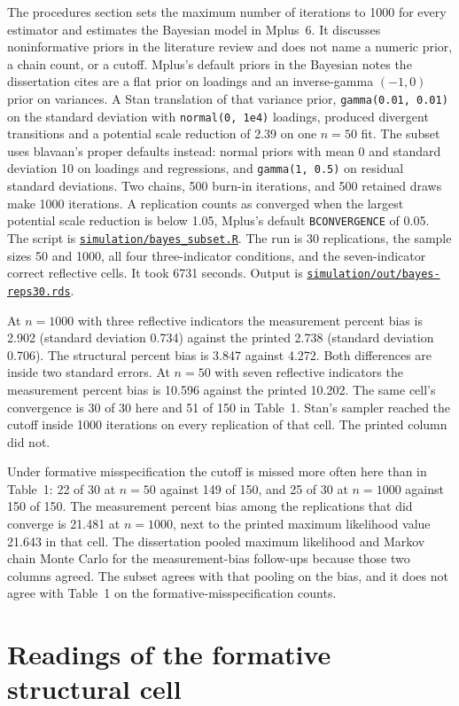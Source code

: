 \documentclass[11pt]{article}
\newcommand{\codebase}{https://github.com/alectionary/vibe-math/blob/master/formalization/chumney-sem-small-samples}
\newcommand{\filelink}[1]{\href{\codebase/#1}{\texttt{#1}}}
\gdef\linkbayes{\href{https://github.com/alectionary/vibe-math/blob/master/formalization/chumney-sem-small-samples/simulation/bayes_subset.R}{\texttt{simulation/bayes_subset.R}}}
\begin{document}
The procedures section sets the maximum number of iterations to 1000 for
every estimator and estimates the Bayesian model in Mplus~6. It discusses
noninformative priors in the literature review and does not name a numeric
prior, a chain count, or a cutoff. Mplus's default priors in the Bayesian
notes the dissertation cites are a flat prior on loadings and an
inverse-gamma $(-1, 0)$ prior on variances. A Stan translation of that
variance prior, \texttt{gamma(0.01, 0.01)} on the standard deviation with
\texttt{normal(0, 1e4)} loadings, produced divergent transitions and a
potential scale reduction of 2.39 on one $n=50$ fit. The subset uses
blavaan's proper defaults instead: normal priors with mean 0 and standard
deviation 10 on loadings and regressions, and \texttt{gamma(1, 0.5)} on
residual standard deviations. Two chains, 500 burn-in iterations, and 500
retained draws make 1000 iterations. A replication counts as converged when
the largest potential scale reduction is below 1.05, Mplus's default
\texttt{BCONVERGENCE} of 0.05. The script is
\linkbayes. The run is 30 replications, the
sample sizes 50 and 1000, all four three-indicator conditions, and the
seven-indicator correct reflective cells. It took 6731 seconds. Output is
\filelink{simulation/out/bayes-reps30.rds}.

At $n=1000$ with three reflective indicators the measurement percent bias
is 2.902 (standard deviation 0.734) against the printed 2.738 (standard
deviation 0.706). The structural percent bias is 3.847 against 4.272.
Both differences are inside two standard errors. At $n=50$ with seven
reflective indicators the measurement percent bias is 10.596 against the
printed 10.202. The same cell's convergence is 30 of 30 here and 51 of 150
in Table~1. Stan's sampler reached the cutoff inside 1000 iterations on
every replication of that cell. The printed column did not.

Under formative misspecification the cutoff is missed more often here than
in Table~1: 22 of 30 at $n=50$ against 149 of 150, and 25 of 30 at
$n=1000$ against 150 of 150. The measurement percent bias among the
replications that did converge is 21.481 at $n=1000$, next to the printed
maximum likelihood value 21.643 in that cell. The dissertation pooled
maximum likelihood and Markov chain Monte Carlo for the measurement-bias
follow-ups because those two columns agreed. The subset agrees with that
pooling on the bias, and it does not agree with Table~1 on the
formative-misspecification counts.

\section{Readings of the formative structural cell}
\label{sec:formative}
\end{document}
